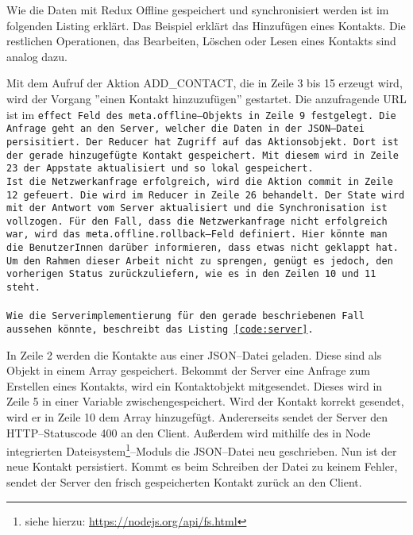 Wie die Daten mit Redux Offline gespeichert und synchronisiert werden ist im folgenden Listing erklärt.
Das Beispiel erklärt das Hinzufügen eines Kontakts. Die restlichen Operationen, das Bearbeiten, Löschen oder Lesen eines Kontakts sind analog dazu.
%
\begin{center}  
\end{center}
%
Mit dem Aufruf der Aktion ADD\_CONTACT, die in Zeile 3 bis 15 erzeugt wird, wird der Vorgang ''einen Kontakt hinzuzufügen'' gestartet.
Die anzufragende URL ist im \tt{effect} Feld des \tt{meta.offline}--Objekts in Zeile 9 festgelegt.
Die Anfrage geht an den Server, welcher die Daten in der \gls{JSON}--Datei persisitiert.
Der Reducer hat Zugriff auf das Aktionsobjekt. Dort ist der gerade hinzugefügte Kontakt gespeichert.
Mit diesem wird in Zeile 23 der \gls{App}state aktualisiert und so lokal gespeichert.\\
Ist die Netzwerkanfrage erfolgreich, wird die Aktion \tt{commit} in Zeile 12 gefeuert.
Die wird im Reducer in Zeile 26 behandelt. Der State wird mit der Antwort vom Server aktualisiert und die Synchronisation ist vollzogen.
Für den Fall, dass die Netzwerkanfrage nicht erfolgreich war, wird das \tt{meta.offline.rollback}--Feld definiert.
Hier könnte man die BenutzerInnen darüber informieren, dass etwas nicht geklappt hat.
Um den Rahmen dieser Arbeit nicht zu sprengen, genügt es jedoch, den vorherigen Status zurückzuliefern, wie es in den Zeilen 10 und 11 steht.\\\\
Wie die Serverimplementierung für den gerade beschriebenen Fall aussehen könnte, beschreibt das Listing \ref{code:server}.
%
\begin{center}  
\end{center}
%
In Zeile 2 werden die Kontakte aus einer \gls{JSON}--Datei geladen. Diese sind als Objekt in einem Array gespeichert.
Bekommt der Server eine Anfrage zum Erstellen eines Kontakts, wird ein Kontaktobjekt mitgesendet. Dieses wird in Zeile 5 in einer Variable zwischengespeichert. 
Wird der Kontakt korrekt gesendet, wird er in Zeile 10 dem Array hinzugefügt.
Andererseits sendet der Server den \gls{HTTP}--Statuscode 400 an den Client. %
Außerdem wird mithilfe des in Node integrierten Dateisystem\footnote{siehe hierzu: \url{https://nodejs.org/api/fs.html}}--Moduls die \gls{JSON}--Datei neu geschrieben.
Nun ist der neue Kontakt persistiert. Kommt es beim Schreiben der Datei zu keinem Fehler, sendet der Server den frisch gespeicherten Kontakt zurück an den Client.